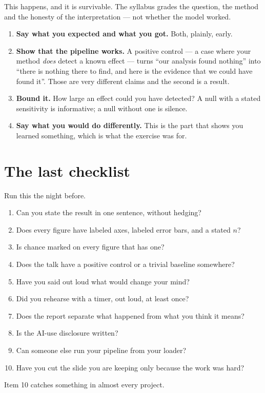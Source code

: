 \documentclass[11pt]{article}
\begin{document}
This happens, and it is survivable. The syllabus grades the question, the method
and the honesty of the interpretation --- not whether the model worked.

\begin{enumerate}
  \item \textbf{Say what you expected and what you got.} Both, plainly, early.
  \item \textbf{Show that the pipeline works.} A positive control --- a case where
        your method \emph{does} detect a known effect --- turns ``our analysis
        found nothing'' into ``there is nothing there to find, and here is the
        evidence that we could have found it''. Those are very different claims
        and the second is a result.
  \item \textbf{Bound it.} How large an effect could you have detected? A null
        with a stated sensitivity is informative; a null without one is silence.
  \item \textbf{Say what you would do differently.} This is the part that shows
        you learned something, which is what the exercise was for.
\end{enumerate}

\section{The last checklist}

Run this the night before.

\begin{enumerate}
  \item Can you state the result in one sentence, without hedging?
  \item Does every figure have labeled axes, labeled error bars, and a stated $n$?
  \item Is chance marked on every figure that has one?
  \item Does the talk have a positive control or a trivial baseline somewhere?
  \item Have you said out loud what would change your mind?
  \item Did you rehearse with a timer, out loud, at least once?
  \item Does the report separate what happened from what you think it means?
  \item Is the AI-use disclosure written?
  \item Can someone else run your pipeline from your loader?
  \item Have you cut the slide you are keeping only because the work was hard?
\end{enumerate}

Item 10 catches something in almost every project.
\end{document}
